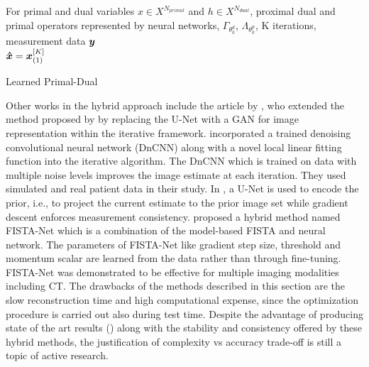 \begin{itemize}
\begin{algorithm}
\SetAlgoLined
For primal and dual variables $x \in X^{N_{primal}}$ and $h \in X^{N_{dual}}$, proximal dual and primal operators represented by neural networks,  $\Gamma_{\theta_{k}^{d}}$, $\Lambda_{\theta_{k}^{p}}$, K iterations, measurement data $\bm{y}$ \\
\Return $\bm{\hat{x}} = \bm{x}_{(1)}^{[K]}$
\caption{Learned Primal-Dual}
\label{alg:pd}
\end{algorithm}



\end{itemize}
 
Other works in the hybrid approach include the article by \cite{xie2019generative}, who extended the method proposed by \cite{gong2019iterative} by replacing the U-Net with a \ac{GAN} for image representation within the iterative framework. \cite{kim2018penalized} incorporated a trained denoising convolutional neural network (DnCNN) along with a novel local linear fitting function into the iterative algorithm. The DnCNN which is trained on data with multiple noise levels improves the image estimate at each iteration. They used simulated and real patient data in their study. In \cite{gupta2018cnn}, a U-Net is used to encode the prior, i.e., to project the current estimate to the prior image set while gradient descent enforces measurement consistency. \cite{xiang2021fista} proposed a hybrid method named FISTA-Net which is a combination of the model-based \ac{FISTA} and neural network. The parameters of FISTA-Net like gradient step size, threshold and momentum scalar are learned from the data rather than through fine-tuning. FISTA-Net was demonstrated to be effective for multiple imaging modalities including \ac{CT}. The drawbacks of the methods described in this section are the slow reconstruction time and high computational expense, since the optimization procedure is carried out also during test time. Despite the advantage of producing state of the art results (\cite{reader2020deep,leuschner2021quantitative}) along with the stability and consistency offered by these hybrid methods, the justification of complexity vs accuracy trade-off is still a topic of active research. 


